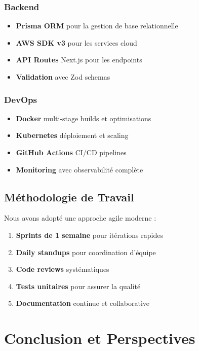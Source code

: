 \documentclass[12pt,a4paper]{report}
\begin{document}
\subsection{Backend}
\begin{itemize}
    \item \textbf{Prisma ORM} pour la gestion de base relationnelle
    \item \textbf{AWS SDK v3} pour les services cloud
    \item \textbf{API Routes} Next.js pour les endpoints
    \item \textbf{Validation} avec Zod schemas
\end{itemize}

\subsection{DevOps}
\begin{itemize}
    \item \textbf{Docker} multi-stage builds et optimisations
    \item \textbf{Kubernetes} déploiement et scaling
    \item \textbf{GitHub Actions} CI/CD pipelines
    \item \textbf{Monitoring} avec observabilité complète
\end{itemize}

\section{Méthodologie de Travail}

Nous avons adopté une approche agile moderne :

\begin{enumerate}
    \item \textbf{Sprints de 1 semaine} pour itérations rapides
    \item \textbf{Daily standups} pour coordination d'équipe
    \item \textbf{Code reviews} systématiques
    \item \textbf{Tests unitaires} pour assurer la qualité
    \item \textbf{Documentation} continue et collaborative
\end{enumerate}

\chapter{Conclusion et Perspectives}
\end{document}
